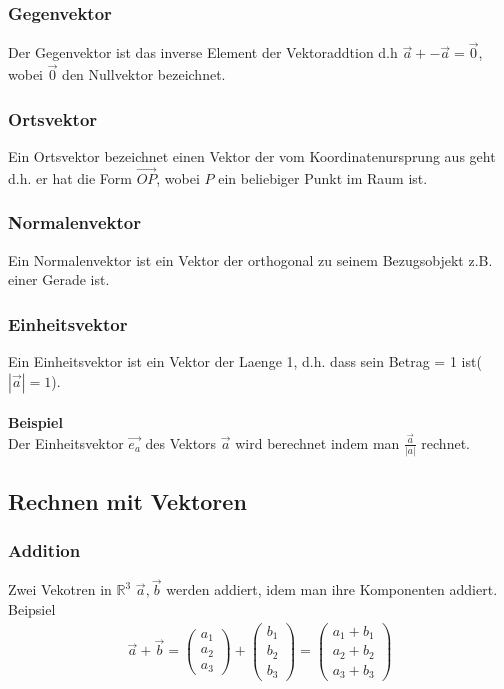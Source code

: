\documentclass[a4paper]{article} %
\begin{document}
	\subsubsection{Gegenvektor}
	Der Gegenvektor ist das inverse Element der Vektoraddtion d.h $ \vec{a}+ -\vec{a}=\vec{0}$, wobei $\vec{0}$ den Nullvektor bezeichnet.
	\subsubsection{Ortsvektor}
	Ein Ortsvektor bezeichnet einen Vektor der vom Koordinatenursprung aus geht d.h. er hat die Form $\vec{OP}$, wobei $P$ ein beliebiger Punkt im Raum ist.
	\subsubsection{Normalenvektor}
	Ein Normalenvektor ist ein Vektor der orthogonal zu seinem Bezugsobjekt z.B. einer Gerade ist.
	\subsubsection{Einheitsvektor}
	Ein Einheitsvektor ist ein Vektor der Laenge 1, d.h. dass sein Betrag = 1 ist($|\vec{a}|=1$).
	\\\\\textbf{Beispiel}\\
	Der Einheitsvektor $\vec{e_a}$ des Vektors $\vec{a}$ wird berechnet indem man $\frac{\vec{a}}{|a|}$ rechnet.
	\subsection{Rechnen mit Vektoren}
	\subsubsection{Addition}
	Zwei Vekotren in $\mathbb{R}^3$ $\vec{a}, \vec{b}$ werden addiert, idem man ihre Komponenten addiert.
	\\Beipsiel\\
	\begin{align*} \vec{a}+\vec{b}=\begin{pmatrix}a_1\\a_2\\a_3\end{pmatrix}+\begin{pmatrix}b_1\\b_2\\b_3\end{pmatrix}=\begin{pmatrix}a_1+b_1\\a_2+b_2\\a_3+b_3\end{pmatrix} \end{align*}
\end{document}

